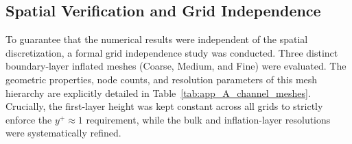 \subsection{Spatial Verification and Grid Independence}
\label{subsec:app_A_channel_mesh}
To guarantee that the numerical results were independent of the spatial discretization, a formal grid independence study was conducted. Three distinct boundary-layer inflated meshes (Coarse, Medium, and Fine) were evaluated. The geometric properties, node counts, and resolution parameters of this mesh hierarchy are explicitly detailed in Table~\ref{tab:app_A_channel_meshes}. Crucially, the first-layer height was kept constant across all grids to strictly enforce the $y^+ \approx 1$ requirement, while the bulk and inflation-layer resolutions were systematically refined. 

